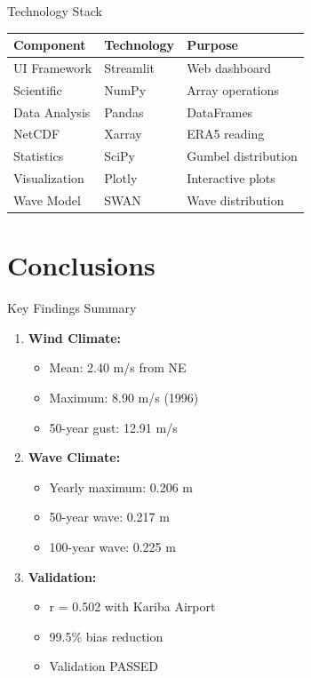 \documentclass[10pt]{beamer}
\begin{document}
\begin{frame}{Technology Stack}
\begin{table}
\centering
\begin{tabular}{lll}
\hline
\textbf{Component} & \textbf{Technology} & \textbf{Purpose} \\
\hline
UI Framework & Streamlit & Web dashboard \\
Scientific & NumPy & Array operations \\
Data Analysis & Pandas & DataFrames \\
NetCDF & Xarray & ERA5 reading \\
Statistics & SciPy & Gumbel distribution \\
Visualization & Plotly & Interactive plots \\
Wave Model & SWAN & Wave distribution \\
\hline
\end{tabular}
\end{table}
\end{frame}

\section{Conclusions}

\begin{frame}{Key Findings Summary}
\begin{enumerate}
    \item \textbf{Wind Climate:}
    \begin{itemize}
        \item Mean: 2.40 m/s from NE
        \item Maximum: 8.90 m/s (1996)
        \item 50-year gust: 12.91 m/s
    \end{itemize}
    
    \item \textbf{Wave Climate:}
    \begin{itemize}
        \item Yearly maximum: 0.206 m
        \item 50-year wave: 0.217 m
        \item 100-year wave: 0.225 m
    \end{itemize}
    
    \item \textbf{Validation:}
    \begin{itemize}
        \item r = 0.502 with Kariba Airport
        \item 99.5\% bias reduction
        \item Validation PASSED
    \end{itemize}
\end{enumerate}
\end{frame}
\end{document}
